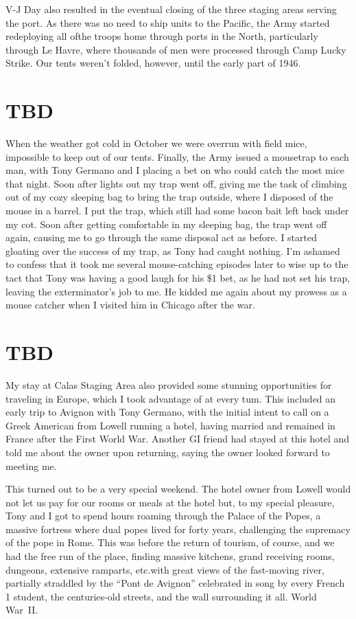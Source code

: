 \documentclass[../m3y]{subfiles}
\begin{document}
V-J Day also resulted in the eventual closing of the three staging areas serving the port. As there was no need to ship units to the Pacific, the Army started redeploying all ofthe troops home through ports in the North, particularly through Le Havre, where thousands of men were processed through Camp Lucky Strike. Our tents weren't folded, however, until the early part of 1946.

\section{TBD}
When the weather got cold in October we were overrun with field mice, impossible to keep out of our tents. Finally, the Army issued a mousetrap to each man, with Tony Germano and I placing a bet on who could catch the most mice that night. Soon after lights out my trap went off, giving me the task of climbing out of my cozy sleeping bag to bring the trap outside, where I disposed of the mouse in a barrel. I put the trap, which still had some bacon bait left back under my cot. Soon after getting comfortable in my sleeping bag, the trap went off again, causing me to go through the same disposal act as before. I started gloating over the success of my trap, as Tony had caught nothing. I'm ashamed to confess that it took me several mouse-catching episodes later to wise up to the tact that Tony was having a good laugh for his \$1 bet, as he had not set his trap, leaving the exterminator's job to me. He kidded me again about my prowess as a mouse catcher when I visited him in Chicago after the war.

\section{TBD}
My stay at Calas Staging Area also provided some stunning opportunities for traveling in Europe, which I took advantage of at every tum. This included an early trip to Avignon with Tony Germano, with the initial intent to call on a Greek American from Lowell running a hotel, having married and remained in France after the First World War. Another GI friend had stayed at this hotel and told me about the owner upon returning, saying the owner looked forward to meeting me.

This turned out to be a very special weekend. The hotel owner from Lowell would not let us pay for our rooms or meals at the hotel but, to my special pleasure, Tony and I got to spend hours roaming through the Palace of the Popes, a massive fortress where dual popes lived for forty years, challenging the supremacy of the pope in Rome. This was before the return of tourism, of course, and we had the free run of the place, finding massive kitchens, grand receiving rooms, dungeons, extensive ramparts, etc.\@ with great views of the fast-moving river, partially straddled by the ``Pont de Avignon'' celebrated in song by every French 1 student, the centuries-old streets, and the wall surrounding it all.
World War\thinspace\ II\@.
\end{document}
